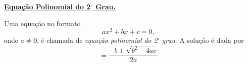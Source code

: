 \documentclass[12pt,a4paper]{article}
\begin{document}
	\begin{center}
		\textbf{\underline{{\Large Equação Polinomial do 2$^\circ$ Grau.}}}
	\end{center}
	
	Uma equação no formato
	$$ax^2 + bx + c = 0,$$
	onde $a\neq 0$, é chamada de \textit{equação polinomial do 2$^\circ$ grau}. A solução é dada por $$ = \frac{-b \pm \sqrt{b^2 - 4ac}}{2a}$$
\end{document}
